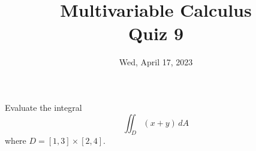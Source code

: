 \documentclass[aspectratio=169]{beamer}
\title{ Multivariable Calculus \\ Quiz 9}
\institute{Fulbright University Vietnam}
\date{Wed, April 17, 2023}
\begin{document}
\maketitle

\begin{frame}
    Evaluate the integral
    $$\iint_D (x+y) \, dA$$
    where $D = [1,3]\times [2,4]$.
\end{frame}
\end{document}
